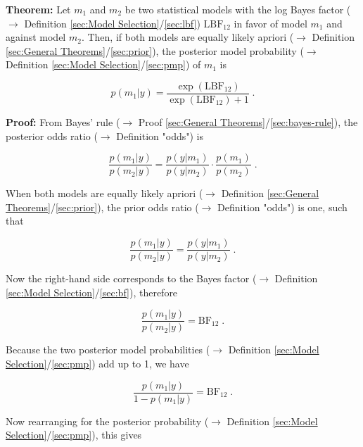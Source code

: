 \documentclass[a4paper,12pt,twoside]{book}
\begin{document}
\textbf{Theorem:} Let $m_1$ and $m_2$ be two statistical models with the log Bayes factor ($\rightarrow$ Definition \ref{sec:Model Selection}/\ref{sec:lbf}) $\mathrm{LBF}_{12}$ in favor of model $m_1$ and against model $m_2$. Then, if both models are equally likely apriori ($\rightarrow$ Definition \ref{sec:General Theorems}/\ref{sec:prior}), the posterior model probability ($\rightarrow$ Definition \ref{sec:Model Selection}/\ref{sec:pmp}) of $m_1$ is

\begin{equation} \label{eq:pmp-lbf-PMP-LBF}
p(m_1|y) = \frac{\exp(\mathrm{LBF}_{12})}{\exp(\mathrm{LBF}_{12}) + 1} \; .
\end{equation}


\vspace{1em}
\textbf{Proof:} From Bayes' rule ($\rightarrow$ Proof \ref{sec:General Theorems}/\ref{sec:bayes-rule}), the posterior odds ratio ($\rightarrow$ Definition "odds") is

\begin{equation} \label{eq:pmp-lbf-post-odds-s1}
\frac{p(m_1|y)}{p(m_2|y)} = \frac{p(y|m_1)}{p(y|m_2)} \cdot \frac{p(m_1)}{p(m_2)} \; .
\end{equation}

When both models are equally likely apriori ($\rightarrow$ Definition \ref{sec:General Theorems}/\ref{sec:prior}), the prior odds ratio ($\rightarrow$ Definition "odds") is one, such that

\begin{equation} \label{eq:pmp-lbf-post-odds-s2}
\frac{p(m_1|y)}{p(m_2|y)} = \frac{p(y|m_1)}{p(y|m_2)} \; .
\end{equation}

Now the right-hand side corresponds to the Bayes factor ($\rightarrow$ Definition \ref{sec:Model Selection}/\ref{sec:bf}), therefore

\begin{equation} \label{eq:pmp-lbf-post-odds-s4}
\frac{p(m_1|y)}{p(m_2|y)} = \mathrm{BF}_{12} \; .
\end{equation}

Because the two posterior model probabilities ($\rightarrow$ Definition \ref{sec:Model Selection}/\ref{sec:pmp}) add up to 1, we have

\begin{equation} \label{eq:pmp-lbf-post-odds-s3}
\frac{p(m_1|y)}{1-p(m_1|y)} = \mathrm{BF}_{12} \; .
\end{equation}

Now rearranging for the posterior probability ($\rightarrow$ Definition \ref{sec:Model Selection}/\ref{sec:pmp}), this gives
\end{document}
